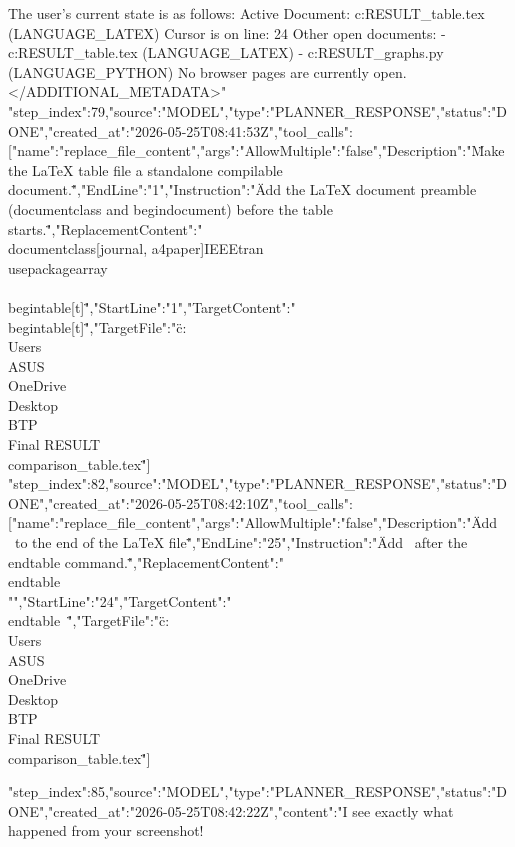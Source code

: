 \begin{table}[t]
{\begin{table}[t]
{{The user's current state is as follows:
Active Document: c:\Users\ASUS\OneDrive\Desktop\BTP\Final RESULT\comparison_table.tex (LANGUAGE_LATEX)
Cursor is on line: 24
Other open documents:
- c:\Users\ASUS\OneDrive\Desktop\BTP\Final RESULT\comparison_table.tex (LANGUAGE_LATEX)
- c:\Users\ASUS\OneDrive\Desktop\BTP\Final RESULT\generate_graphs.py (LANGUAGE_PYTHON)
No browser pages are currently open.
</ADDITIONAL_METADATA>"}
{"step_index":79,"source":"MODEL","type":"PLANNER_RESPONSE","status":"DONE","created_at":"2026-05-25T08:41:53Z","tool_calls":[{"name":"replace_file_content","args":{"AllowMultiple":"false","Description":"\"Make the LaTeX table file a standalone compilable document.\"","EndLine":"1","Instruction":"\"Add the LaTeX document preamble (documentclass and begin{document}) before the table starts.\"","ReplacementContent":"\"\\documentclass[journal, a4paper]{IEEEtran}\
\\usepackage{array}\
\
\\
\
\\begin{table}[t]\"","StartLine":"1","TargetContent":"\"\\begin{table}[t]\"","TargetFile":"\"c:\\Users\\ASUS\\OneDrive\\Desktop\\BTP\\Final RESULT\\comparison_table.tex\""}}]}
{"step_index":82,"source":"MODEL","type":"PLANNER_RESPONSE","status":"DONE","created_at":"2026-05-25T08:42:10Z","tool_calls":[{"name":"replace_file_content","args":{"AllowMultiple":"false","Description":"\"Add \ to the end of the LaTeX file\"","EndLine":"25","Instruction":"\"Add \ after the \\end{table} command.\"","ReplacementContent":"\"\\end{table}\
\
\\"","StartLine":"24","TargetContent":"\"\\end{table}\
\"","TargetFile":"\"c:\\Users\\ASUS\\OneDrive\\Desktop\\BTP\\Final RESULT\\comparison_table.tex\""}}]}
{"step_index":85,"source":"MODEL","type":"PLANNER_RESPONSE","status":"DONE","created_at":"2026-05-25T08:42:22Z","content":"I see exactly what happened from your screenshot! 

}}
\end{table}}
\end{table}
